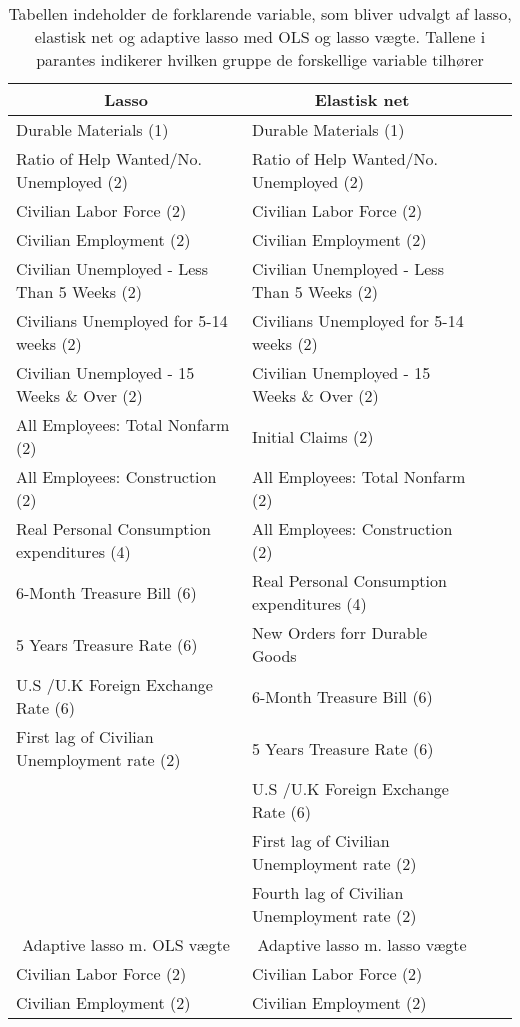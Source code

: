  \begin{table}
\small
\center
\begin{tabular}{lllc}
\toprule
\multicolumn{1}{c}{Lasso} & \multicolumn{1}{c}{Elastisk net} \\ \midrule
Durable Materials (1)   &Durable Materials (1)    \\
Ratio of Help Wanted/No. Unemployed (2) &  Ratio of Help Wanted/No. Unemployed (2) \\
Civilian Labor Force (2) & Civilian Labor Force (2)  \\
Civilian Employment  (2) & Civilian Employment  (2)  \\
Civilian Unemployed - Less Than 5 Weeks (2) & Civilian Unemployed - Less Than 5 Weeks (2)  \\
Civilians Unemployed for 5-14 weeks (2) &Civilians Unemployed for 5-14 weeks (2)    \\
Civilian Unemployed - 15 Weeks \& Over (2) & Civilian Unemployed - 15 Weeks \& Over (2)  \\
All Employees: Total Nonfarm (2) & Initial Claims (2)  \\
All Employees: Construction (2) & All Employees: Total Nonfarm (2) \\
Real Personal Consumption expenditures (4) &  All Employees: Construction (2) \\
6-Month Treasure Bill (6) & Real Personal Consumption expenditures (4)  \\
5 Years Treasure Rate (6) & New Orders forr Durable Goods  \\
U.S /U.K Foreign Exchange Rate  (6) & 6-Month Treasure Bill (6)   \\
First lag of Civilian Unemployment rate (2) &  5 Years Treasure Rate (6)\\
& U.S /U.K Foreign Exchange Rate  (6)  \\ 
&  First lag of Civilian Unemployment rate (2) \\
&  Fourth lag of Civilian Unemployment rate (2)  \\\bottomrule 
\toprule
\multicolumn{1}{c}{Adaptive lasso m. OLS vægte} & \multicolumn{1}{c}{ Adaptive lasso m. lasso vægte}  \\ \midrule
Civilian Labor Force  (2) & Civilian Labor Force (2) \\
Civilian Employment (2) &  Civilian Employment (2) \\
 \bottomrule 
\end{tabular}
\caption{Tabellen indeholder de forklarende variable, som bliver udvalgt af lasso, elastisk net og adaptive lasso med OLS og lasso vægte. Tallene i parantes indikerer hvilken gruppe de forskellige variable tilhører} \label{tab: lasso_ud}
\end{table}
